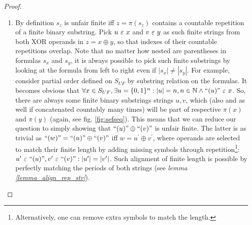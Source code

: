 \begin{proof}
\begin{enumerate}[label=(\roman*)]
    \item By definition $s_z$ is unfair finite iff $z = \pi(s_z)$ contains a countable repetition of a finite binary substring. Pick $u \ \varepsilon\  x$ and $v \ \varepsilon\  y$ as such finite strings from both XOR operands in $z = x \oplus y$, so that indexes of their countable repetitions overlap. Note that no matter how nested are parentheses in formulas $s_x$ and $s_y$, it is always possible to pick such finite substrings by looking at the formula from left to right even if $|s_x| \neq |s_y|$. For example, consider partial order defined on $S_{UF}$ by substring relation on the formulas. It becomes obvious that $\forall x \in S_{UF}, \exists u = \{0,1\}^n: |u| = n, n \in \mathbb{N} \land  \text{``} (u) \text{''} \ \varepsilon\  x$. So, there are always some finite binary substrings strings $u, v$, which (also and as well if concatenated countably many times) will be part of respective $\pi(x)$ and $\pi(y)$ (again, see fig. \ref{fig:sefseq}). This means that we can reduce our question to simply showing that $\text{``} (u)\text{''}  \oplus \text{``} (v) \text{''}$ is unfair finite. The latter is as trivial as $\text{``} (w) \text{''}  = \text{``} (u) \text{''} \oplus \text{``} (v) \text{''}$ iff $w = u^{\prime} \oplus v^{\prime}$, where operands are selected to match their finite length by adding missing symbols through repetition\footnote{Alternatively, one can remove extra symbols to match the length.}: $u^\prime \ \varepsilon\  \text{``} (u) \text{''}, v^\prime \ \varepsilon\  \text{``} (v) \text{''}: |u^{\prime}| = |v^{\prime}|$. Such alignment of finite length is possible by perfectly matching the periods of both strings (see \textit{lemma \ref{lemma_align_rep_str}}).
  \end{enumerate}
\end{proof}

